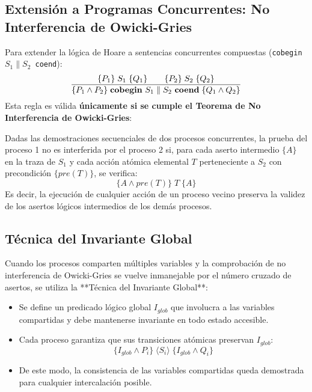 \subsection{Extensión a Programas Concurrentes: No Interferencia de Owicki-Gries}
Para extender la lógica de Hoare a sentencias concurrentes compuestas (\texttt{cobegin $S_1 \parallel S_2$ coend}):
\begin{equation}
\frac{\{P_1\} \; S_1 \; \{Q_1\} \quad\quad \{P_2\} \; S_2 \; \{Q_2\}}{\{P_1 \land P_2\} \; \text{\textbf{cobegin} } S_1 \parallel S_2 \text{ \textbf{coend}} \; \{Q_1 \land Q_2\}}
\end{equation}
Esta regla es válida \textbf{únicamente si se cumple el Teorema de No Interferencia de Owicki-Gries}:

\begin{definicion}
Dadas las demostraciones secuenciales de dos procesos concurrentes, la prueba del proceso 1 no es interferida por el proceso 2 si, para cada aserto intermedio $\{A\}$ en la traza de $S_1$ y cada acción atómica elemental $T$ perteneciente a $S_2$ con precondición $\{pre(T)\}$, se verifica:
\begin{equation}
\{A \land pre(T)\} \; T \; \{A\}
\end{equation}
Es decir, la ejecución de cualquier acción de un proceso vecino preserva la validez de los asertos lógicos intermedios de los demás procesos.
\end{definicion}

\subsection{Técnica del Invariante Global}
Cuando los procesos comparten múltiples variables y la comprobación de no interferencia de Owicki-Gries se vuelve inmanejable por el número cruzado de asertos, se utiliza la **Técnica del Invariante Global**:
\begin{itemize}
    \item Se define un predicado lógico global $I_{glob}$ que involucra a las variables compartidas y debe mantenerse invariante en todo estado accesible.
    \item Cada proceso garantiza que sus transiciones atómicas preservan $I_{glob}$:
    \begin{equation}
    \{I_{glob} \land P_i\} \; \langle S_i \rangle \; \{I_{glob} \land Q_i\}
    \end{equation}
    \item De este modo, la consistencia de las variables compartidas queda demostrada para cualquier intercalación posible.
\end{itemize}
